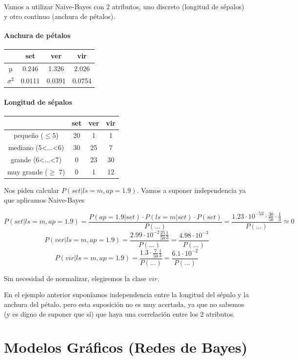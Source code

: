 \documentclass{apuntes}
\begin{document}
\begin{example}
Vamos a utilizar Naive-Bayes con 2 atributos, uno discreto (longitud de sépalos) y otro continuo (anchura de pétalos).



\paragraph{Anchura de pétalos}
\begin{tabular}{c|ccc}
& set & ver & vir \\\hline
µ & 0.246 & 1.326 & 2.026\\
$σ^2$ & 0.0111 & 0.0391 & 0.0754
\end{tabular}

\paragraph{Longitud de sépalos}
\begin{tabular}{c|ccc}
& set & ver & vir \\\hline
pequeño ($\leq$5) & 20 & 1 & 1\\
mediano (5<...<6) & 30 & 25 & 7\\
grande (6<...<7) & 0 & 23 & 30\\
muy grande ($\geq$ 7) & 0 & 1 & 12
\end{tabular}

Nos piden calcular $P(set|ls=m,ap=1.9)$. Vamos a suponer independencia ya que aplicamos Naive-Bayes

\[
P(set|ls=m,ap=1.9) = \frac{P(ap=1.9|set)·P(ls=m|set)·P(set)}{P(...)} = \frac{1.23·10^{-53}·\frac{30}{50}·\frac{1}{3}}{P(...)} \simeq 0
\]
\[
P(ver|ls=m,ap=1.9) = \frac{2.99·10^{-2}\frac{25}{50}\frac{1}{3}}{P(...)} = \frac{4.98·10^{-3}}{P(...)}
\]
\[
P(vir|ls=m,ap=1.9) = \frac{1.3·\frac{7}{50}\frac{1}{3}}{P(...)} = \frac{6.1·10^{-2}}{P(...)}
\]

Sin necesidad de normalizar, elegiremos la clase $vir$.

\end{example}

En el ejemplo anterior suponíamos independencia entre la longitud del sépalo y la anchura del pétalo, pero esta suposición no es muy acertada, ya que no sabemos (y es digno de suponer que sí) que haya una correlación entre los 2 atributos.


\section{Modelos Gráficos (Redes de Bayes)}
\end{document}
